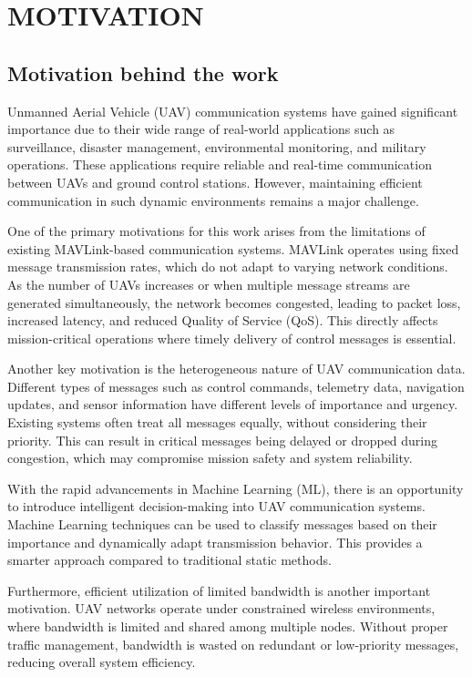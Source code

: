 \chapter{MOTIVATION}

\section{Motivation behind the work}

Unmanned Aerial Vehicle (UAV) communication systems have gained significant importance due to their wide range of real-world applications such as surveillance, disaster management, environmental monitoring, and military operations. These applications require reliable and real-time communication between UAVs and ground control stations. However, maintaining efficient communication in such dynamic environments remains a major challenge.

One of the primary motivations for this work arises from the limitations of existing MAVLink-based communication systems. MAVLink operates using fixed message transmission rates, which do not adapt to varying network conditions. As the number of UAVs increases or when multiple message streams are generated simultaneously, the network becomes congested, leading to packet loss, increased latency, and reduced Quality of Service (QoS). This directly affects mission-critical operations where timely delivery of control messages is essential.

Another key motivation is the heterogeneous nature of UAV communication data. Different types of messages such as control commands, telemetry data, navigation updates, and sensor information have different levels of importance and urgency. Existing systems often treat all messages equally, without considering their priority. This can result in critical messages being delayed or dropped during congestion, which may compromise mission safety and system reliability.

With the rapid advancements in Machine Learning (ML), there is an opportunity to introduce intelligent decision-making into UAV communication systems. Machine Learning techniques can be used to classify messages based on their importance and dynamically adapt transmission behavior. This provides a smarter approach compared to traditional static methods.

Furthermore, efficient utilization of limited bandwidth is another important motivation. UAV networks operate under constrained wireless environments, where bandwidth is limited and shared among multiple nodes. Without proper traffic management, bandwidth is wasted on redundant or low-priority messages, reducing overall system efficiency.

